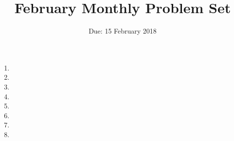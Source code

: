 \documentclass[12pt]{article}
\title{February Monthly Problem Set}
\author{Due: 15 February 2018}
\date{}
\begin{document}
 \maketitle

\begin{enumerate}

\item %


\item %


\item %


\item %


\item %


\item %


\item %


\item %


\end{enumerate}
\end{document}
